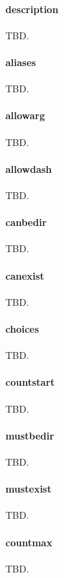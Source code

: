 \documentclass[a4paper]{article}
\begin{document}
\paragraph{description} TBD.

\label{prop:aliases}
\paragraph{aliases} TBD.

\label{prop:allowarg}
\paragraph{allowarg} TBD.

\label{prop:allowdash}
\paragraph{allowdash} TBD.

\label{prop:canbedir}
\paragraph{canbedir} TBD.

\label{prop:canexist}
\paragraph{canexist} TBD.

\label{prop:choices}
\paragraph{choices} TBD.

\label{prop:countstart}
\paragraph{countstart} TBD.

\label{prop:mustbedir}
\paragraph{mustbedir} TBD.

\label{prop:mustexist}
\paragraph{mustexist} TBD.

\label{prop:countmax}
\paragraph{countmax} TBD.
\end{document}
